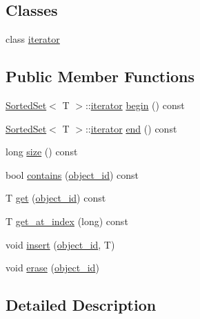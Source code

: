 \subsection*{Classes}
\begin{DoxyCompactItemize}
\item 
class \hyperlink{classmlnet_1_1_sorted_set_1_1iterator}{iterator}
\end{DoxyCompactItemize}
\subsection*{Public Member Functions}
\begin{DoxyCompactItemize}
\item 
\hyperlink{classmlnet_1_1_sorted_set}{Sorted\+Set}$<$ T $>$\+::\hyperlink{classmlnet_1_1_sorted_set_1_1iterator}{iterator} \hyperlink{classmlnet_1_1_sorted_set_a15e228958332c123992f64df476324a3}{begin} () const 
\item 
\hyperlink{classmlnet_1_1_sorted_set}{Sorted\+Set}$<$ T $>$\+::\hyperlink{classmlnet_1_1_sorted_set_1_1iterator}{iterator} \hyperlink{classmlnet_1_1_sorted_set_ac88f8211ad1c259ee564320964085b58}{end} () const 
\item 
long \hyperlink{classmlnet_1_1_sorted_set_acd1e6023e51870488b53738d3609c784}{size} () const 
\item 
bool \hyperlink{classmlnet_1_1_sorted_set_a8d3dc2becc4da73e27ca44ef3dc0112c}{contains} (\hyperlink{namespacemlnet_a318fc9bfdb74e1da4d44d0c50d4a453d}{object\+\_\+id}) const 
\item 
T \hyperlink{classmlnet_1_1_sorted_set_a09a806a0625594688d7551a3cd2b6b6c}{get} (\hyperlink{namespacemlnet_a318fc9bfdb74e1da4d44d0c50d4a453d}{object\+\_\+id}) const 
\item 
T \hyperlink{classmlnet_1_1_sorted_set_a2268be8183ea413d6c85a41051f8bc2e}{get\+\_\+at\+\_\+index} (long) const 
\item 
void \hyperlink{classmlnet_1_1_sorted_set_a463ccc94cdfb56b0c45c418f91067fc8}{insert} (\hyperlink{namespacemlnet_a318fc9bfdb74e1da4d44d0c50d4a453d}{object\+\_\+id}, T)
\item 
void \hyperlink{classmlnet_1_1_sorted_set_a0ff289209df1bc8f890078a31eca3e44}{erase} (\hyperlink{namespacemlnet_a318fc9bfdb74e1da4d44d0c50d4a453d}{object\+\_\+id})
\end{DoxyCompactItemize}


\subsection{Detailed Description}
